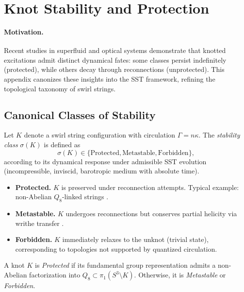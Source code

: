 \section{Knot Stability and Protection}
\label{app:knot_protection}

\paragraph{Motivation.}
    Recent studies in superfluid and optical systems demonstrate that knotted excitations admit distinct dynamical fates: some classes persist indefinitely (protected), while others decay through reconnections (unprotected). This appendix canonizes these insights into the SST framework, refining the topological taxonomy of swirl strings.

\subsection{Canonical Classes of Stability}

\begin{definition}
    Let $K$ denote a swirl string configuration with circulation $\Gamma = n \kappa$. The \emph{stability class} $\sigma(K)$ is defined as
    \[
        \sigma(K) \in \{ \text{Protected}, \text{Metastable}, \text{Forbidden} \},
    \]
    according to its dynamical response under admissible SST evolution (incompressible, inviscid, barotropic medium with absolute time).
\end{definition}

\begin{itemize}
    \item \textbf{Protected.} $K$ is preserved under reconnection attempts. Typical example: non-Abelian $Q_8$-linked strings \cite{Annala2025}.
    \item \textbf{Metastable.} $K$ undergoes reconnections but conserves partial helicity via writhe transfer \cite{Kleckner2016}.
    \item \textbf{Forbidden.} $K$ immediately relaxes to the unknot (trivial state), corresponding to topologies not supported by quantized circulation.
\end{itemize}

\begin{corollary}
    A knot $K$ is \emph{Protected} if its fundamental group representation admits a non-Abelian factorization into $Q_8 \subset \pi_1(S^3 \setminus K)$. Otherwise, it is \emph{Metastable} or \emph{Forbidden}.
\end{corollary}

